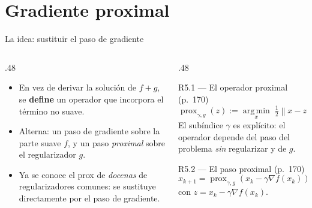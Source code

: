 \documentclass[10pt,aspectratio=169]{beamer}
\newcommand{\norm}[1]{\left\lVert #1 \right\rVert}
\newcommand{\prox}{\operatorname{prox}}
\newcommand{\argmin}{\operatorname*{arg\,min}}
\begin{document}
\section{Gradiente proximal}

\begin{frame}{La idea: sustituir el paso de gradiente}
  \small
  \begin{columns}[T,onlytextwidth]
    \begin{column}{.48\textwidth}
      \begin{itemize}
        \item En vez de derivar la solución de $f+g$, se \textbf{define} un
          operador que incorpora el término no suave.
        \item Alterna: un paso de gradiente sobre la parte suave $f$, y un
          paso \emph{proximal} sobre el regularizador $g$.
        \item Ya se conoce el prox de \emph{docenas} de regularizadores
          comunes: se sustituye directamente por el paso de gradiente.
      \end{itemize}
    \end{column}
    \begin{column}{.48\textwidth}
      \begin{block}{R5.1 --- El operador proximal (p.~170)}
        \small
        \[
          \prox_{\gamma,g}(z) := \argmin_x\;
          \tfrac{1}{2}\norm{x-z}_2^2 + \gamma g(x) \tag{5.3}
        \]
        El subíndice $\gamma$ es explícito: el operador depende del paso del
        problema \emph{sin} regularizar y de $g$.
      \end{block}
      \begin{block}{R5.2 --- El paso proximal (p.~170)}
        \small
        \[
          x_{k+1} = \prox_{\gamma,g}\!\left(x_k - \gamma\nabla f(x_k)\right)
          \tag{5.2}
        \]
        con $z = x_k - \gamma\nabla f(x_k)$.
      \end{block}
    \end{column}
  \end{columns}
\end{frame}
\end{document}
